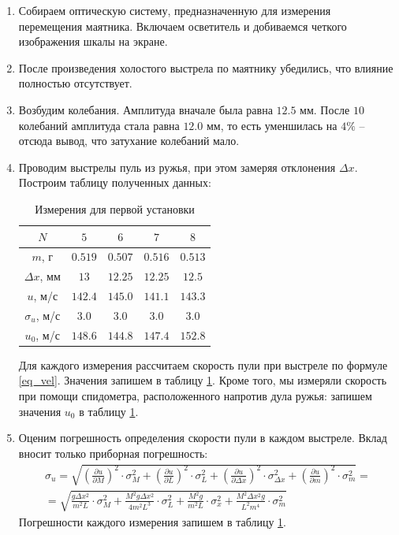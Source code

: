 \documentclass[a4paper,12pt]{article}
\begin{document}
\begin{enumerate}
    \item Собираем оптическую систему, предназначенную для измерения перемещения маятника. Включаем осветитель и добиваемся четкого изображения шкалы на экране.
    \item После произведения холостого выстрела по маятнику убедились, что влияние полностью отсутствует.
    \item Возбудим колебания. Амплитуда вначале была равна $12.5$ мм. После $10$ колебаний амплитуда стала равна $12.0$ мм, то есть уменшилась на $4\%$ -- отсюда вывод, что затухание колебаний мало.
    \item Проводим выстрелы пуль из ружья, при этом замеряя отклонения $\Delta x$. Построим таблицу полученных данных:
    \begin{table}[h]
        \centering
        \begin{tabular}{|c|c|c|c|c|} \hline 
            $N$ & $5$ & $6$ & $7$ & $8$ \\ \hline 
            $m$, г & $0.519$ & $0.507$ & $0.516$ & $0.513$ \\ \hline 
            $\Delta x$, мм & $13$ & $12.25$ & $12.25$ & $12.5$ \\ \hline 
            $u$, м/с & $142.4$ & $145.0$ & $141.1$ & $143.3$ \\ \hline
            $\sigma_u$, м/с & $3.0$ & $3.0$ & $3.0$ & $3.0$ \\ \hline
            $u_0$, м/с & $148.6$ & $144.8$ & $147.4$ & $152.8$ \\ \hline
            \end{tabular}
        \caption{Измерения для первой установки}
        \label{table1}
    \end{table}

    Для каждого измерения рассчитаем скорость пули при выстреле по формуле \ref{eq_vel}. Значения запишем в таблицу \ref{table1}. Кроме того, мы измеряли скорость при помощи спидометра, расположенного напротив дула ружья: запишем значения $u_0$ в таблицу \ref{table1}.

    \item Оценим погрешность определения скорости пули в каждом выстреле. Вклад вносит только приборная погрешность:
    \begin{multline*}
        \sigma_{u} = \sqrt{\left(\frac{\partial{u}}{\partial{M}}\right)^2\cdot\sigma_M^2 + \left(\frac{\partial{u}}{\partial{L}}\right)^2\cdot \sigma_L^2 + \left(\frac{\partial{u}}{\partial{\Delta x}}\right)^2\cdot \sigma_{\Delta x}^2 + \left(\frac{\partial{u}}{\partial{m}}\right)^2\cdot \sigma_{m}^2} = \\
        = \sqrt{\frac{g\Delta x^2}{m^2L}\cdot \sigma_M^2 + \frac{M^2g\Delta x^2}{4m^2L^3}\cdot \sigma_L^2 + \frac{M^2g}{m^2L}\cdot \sigma_x^2 + \frac{M^2\Delta x^2g}{L^2 m^4}\cdot \sigma_m^2}
    \end{multline*}
    Погрешности каждого измерения запишем в таблицу \ref{table1}.
    

\end{enumerate}
\end{document}
